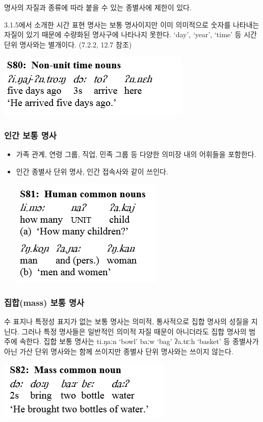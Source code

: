 명사의 자질과 종류에 따라 붙을 수 있는 종별사에 제한이 있다. 

3.1.5에서 소개한 시간 표현 명사는 보통 명사이지만 이미 의미적으로 숫자를 나타내는 자질이 있기 때문에 수량화된 명사구에 나타나지 못한다. `day', `year', `time' 등 시간 단위 명사와는 별개이다. (7.2.2, 12.7 참조)

\includegraphics{Pacoh/src/PacohS80.png}

\subsubsection{인간 보통 명사}
\begin{itemize}
\item 가족 관계, 연령 그룹, 직업, 민족 그룹 등 다양한 의미장 내의 어휘들을 포함한다.
\item 인간 종별사 단위 명사, 인간 접속사와 같이 쓰인다.

\includegraphics{Pacoh/src/PacohS81.png}

\end{itemize}

\subsubsection{집합(mass) 보통 명사}
수 표지나 특정성 표지가 없는 보통 명사는 의미적, 통사적으로 집합 명사의 성질을 지닌다.
그러나 특정 명사들은 일반적인 의미적 자질 때문이 아니더라도 집합 명사의 범주에 속한다.
집합 보통 명사는 ti.ŋaːn `bowl' baːw `bag' ʔa.tɛːh `basket' 등 종별사가 아닌 가산 단위 명사와는 함께 쓰이지만 종별사 단위 명사와는 쓰이지 않는다.

\includegraphics{Pacoh/src/PacohS82.png}

